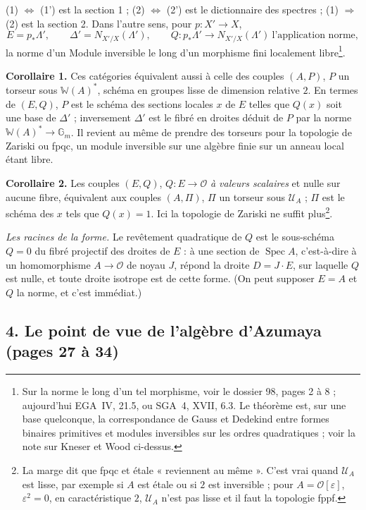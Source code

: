 \documentclass[11pt,a4paper]{article}
\begin{document}
(1) $\Leftrightarrow$ (1') est la section 1 ; (2) $\Leftrightarrow$ (2') est le dictionnaire des
spectres ; (1) $\Rightarrow$ (2) est la section 2. Dans l'autre sens, pour $p : X' \to X$,
\[
  E = p_{*}\Lambda', \qquad \Delta' = N_{X'/X}(\Lambda'), \qquad Q : p_{*}\Lambda' \to N_{X'/X}(\Lambda') \ \text{l'application norme},
\]
la norme d'un Module inversible le long d'un morphisme fini localement
libre\footnote{Sur la norme le long d'un tel morphisme, voir le dossier 98, pages
2 à 8 ; aujourd'hui EGA~IV, 21.5, ou SGA~4, XVII, 6.3. Le théorème est, sur une
base quelconque, la correspondance de Gauss et Dedekind entre formes binaires
primitives et modules inversibles sur les ordres quadratiques ; voir la note sur
Kneser et Wood ci-dessus.}.

\textbf{Corollaire 1.} Ces catégories équivalent aussi à celle des couples $(A, P)$,
$P$ un torseur sous $\mathbb{W}(A)^{*}$, schéma en groupes lisse de dimension
relative $2$. En termes de $(E, Q)$, $P$ est le schéma des sections locales $x$ de
$E$ telles que $Q(x)$ soit une base de $\Delta'$ ; inversement $\Delta'$ est le fibré
en droites déduit de $P$ par la norme $\mathbb{W}(A)^{*} \to \mathbb{G}_m$. Il revient au
même de prendre des torseurs pour la topologie de Zariski ou fpqc, un module
inversible sur une algèbre finie sur un anneau local étant libre.

\textbf{Corollaire 2.} Les couples $(E, Q)$, $Q : E \to \mathcal{O}$ \emph{à valeurs
scalaires} et nulle sur aucune fibre, équivalent aux couples $(A, \Pi)$, $\Pi$ un
torseur sous $\mathcal{U}_A$ ; $\Pi$ est le schéma des $x$ tels que $Q(x) = 1$. Ici
la topologie de Zariski ne suffit plus\footnote{La marge dit que fpqc et étale
« reviennent au même ». C'est vrai quand $\mathcal{U}_A$ est lisse, par exemple si $A$
est étale ou si $2$ est inversible ; pour $A = \mathcal{O}[\varepsilon]$, $\varepsilon^{2} =
0$, en caractéristique $2$, $\mathcal{U}_A$ n'est pas lisse et il faut la topologie
fppf.}.

\emph{Les racines de la forme.} Le revêtement quadratique de $Q$ est le
sous-schéma $Q = 0$ du fibré projectif des droites de $E$ : à une section de
$\operatorname{Spec} A$, c'est-à-dire à un homomorphisme $A \to \mathcal{O}$ de noyau $J$,
répond la droite $D = J\cdot E$, sur laquelle $Q$ est nulle, et toute droite
isotrope est de cette forme. (On peut supposer $E = A$ et $Q$ la norme, et
c'est immédiat.)

\subsection*{4. Le point de vue de l'algèbre d'Azumaya (pages 27 à 34)}
\end{document}
